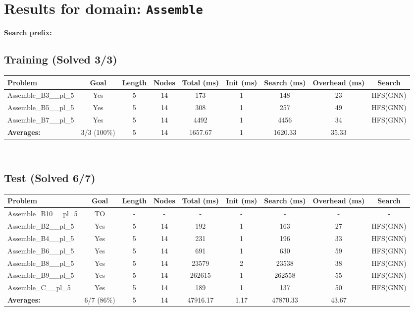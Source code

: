 \documentclass{article}
\begin{document}
\section*{Results for domain: \texttt{Assemble}}
\textbf{Search prefix:} 
\\[0.5cm]
\subsection*{Training (Solved 3/3)}
\begin{tabular}{lcccccccc}
\toprule
Problem & Goal & Length & Nodes & Total (ms) & Init (ms) & Search (ms) & Overhead (ms) & Search \\
\midrule
Assemble\_B3\_\_pl\_5 & Yes & 5 & 14 & 173 & 1 & 148 & 23 & HFS(GNN) \\
Assemble\_B5\_\_pl\_5 & Yes & 5 & 14 & 308 & 1 & 257 & 49 & HFS(GNN) \\
Assemble\_B7\_\_pl\_5 & Yes & 5 & 14 & 4492 & 1 & 4456 & 34 & HFS(GNN) \\
\textbf{Averages:} & 3/3 (100\%) & 5 & 14 & 1657.67 & 1 & 1620.33 & 35.33 & \\
\bottomrule
\end{tabular}
\\[0.7cm]
\subsection*{Test (Solved 6/7)}
\begin{tabular}{lcccccccc}
\toprule
Problem & Goal & Length & Nodes & Total (ms) & Init (ms) & Search (ms) & Overhead (ms) & Search \\
\midrule
Assemble\_B10\_\_pl\_5 & TO & - & - & - & - & - & - & - \\
Assemble\_B2\_\_pl\_5 & Yes & 5 & 14 & 192 & 1 & 163 & 27 & HFS(GNN) \\
Assemble\_B4\_\_pl\_5 & Yes & 5 & 14 & 231 & 1 & 196 & 33 & HFS(GNN) \\
Assemble\_B6\_\_pl\_5 & Yes & 5 & 14 & 691 & 1 & 630 & 59 & HFS(GNN) \\
Assemble\_B8\_\_pl\_5 & Yes & 5 & 14 & 23579 & 2 & 23538 & 38 & HFS(GNN) \\
Assemble\_B9\_\_pl\_5 & Yes & 5 & 14 & 262615 & 1 & 262558 & 55 & HFS(GNN) \\
Assemble\_C\_\_pl\_5 & Yes & 5 & 14 & 189 & 1 & 137 & 50 & HFS(GNN) \\
\textbf{Averages:} & 6/7 (86\%) & 5 & 14 & 47916.17 & 1.17 & 47870.33 & 43.67 & \\
\bottomrule
\end{tabular}
\\[0.7cm]
\end{document}
